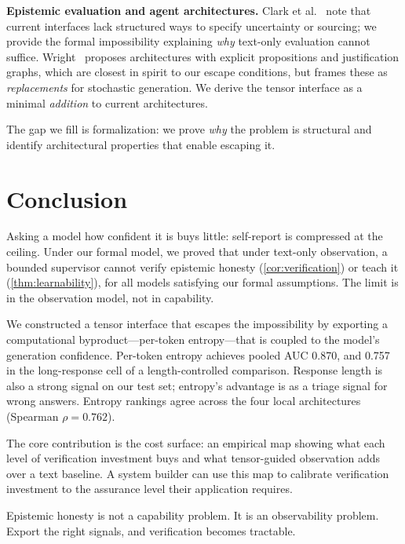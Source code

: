 \documentclass[11pt]{article}
\newcommand{\fakepara}[1]{\noindent\textbf{#1}\xspace}
\begin{document}
\fakepara{Epistemic evaluation and agent architectures.} Clark et al.~\citep{clark2025epistemicalignmentmediatingframework}
note that current interfaces lack structured ways
to specify uncertainty or sourcing; we provide the formal impossibility
explaining \emph{why} text-only evaluation cannot suffice. Wright~\citep{wright2025predictionstructuringepistemic} proposes architectures with explicit propositions
and justification graphs, which are closest in spirit to our escape conditions, but
frames these as \emph{replacements} for stochastic generation. We derive the
tensor interface as a minimal \emph{addition} to current architectures.

The gap we fill is formalization: we prove \emph{why} the problem is structural
and identify architectural properties that enable escaping it.

\section{Conclusion}

Asking a model how confident it is buys little: self-report is compressed at the ceiling. Under our formal model, we proved that under text-only observation, a bounded supervisor cannot verify epistemic honesty (\autoref{cor:verification}) or teach it (\autoref{thm:learnability}), for all models satisfying our formal assumptions. The limit is in the observation model, not in capability.

We constructed a tensor interface that escapes the impossibility by exporting a computational byproduct---per-token entropy---that is coupled to the model's generation confidence. Per-token entropy achieves pooled AUC 0.870, and 0.757 in the long-response cell of a length-controlled comparison. Response length is also a strong signal on our test set; entropy's advantage is as a triage signal for wrong answers. Entropy rankings agree across the four local architectures (Spearman $\rho = 0.762$).

The core contribution is the cost surface: an empirical map showing what each level of verification investment buys and what tensor-guided observation adds over a text baseline. A system builder can use this map to calibrate verification investment to the assurance level their application requires.

Epistemic honesty is not a capability problem. It is an observability problem. Export the right signals, and verification becomes tractable.
\end{document}
